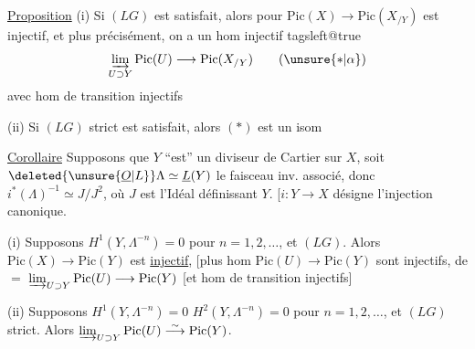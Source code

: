 \uline{Proposition} (i) Si $(LG)$ est satisfait, alors pour  $\mathrm{Pic}(X)\longrightarrow\mathrm{Pic}(X_{/Y})$ est injectif,  et plus précisément, on a un hom injectif
{\csname tagsleft@true\endcsname
\[
\varinjlim_{U\supset Y}\mathrm{Pic}(U)\longrightarrow\mathrm{Pic}(X_{/Y}) \tag*{(\ensuremath{\unsure{*|\alpha}})}
\]
}
avec hom de transition injectifs

(ii) Si $(LG)$ strict est satisfait, alors $(*)$ est un isom

\uline{Corollaire} Supposons que $Y$ ``est'' un diviseur de Cartier sur $X$, soit $\deleted{\unsure{\underline O|L}}\Lambda\simeq\underline L(Y)$ le faisceau inv. associé, donc $i^*(\Lambda)^{-1}\simeq J/J^2$, où $J$ est l'Idéal définissant $Y$. [$i:Y\longrightarrow X$ désigne l'injection canonique.


(i) Supposons $H^1(Y,\Lambda^{-n})=0$ pour $n=1,2,\ldots$, et $(LG)$. Alors $\mathrm{Pic}(X)\longrightarrow\mathrm{Pic}(Y)$ est \uline{injectif}, [plus     hom $\mathrm{Pic}(U)\longrightarrow\mathrm{Pic}(Y)$ sont injectifs,  de $=$ $\varinjlim_{U\supset Y}\mathrm{Pic}(U)\longrightarrow\mathrm{Pic}(Y)$ [et hom de transition injectifs]

(ii) Supposons $H^1(Y,\Lambda^{-n})=0$  $H^2(Y,\Lambda^{-n})=0$ pour $n=1,2,\ldots$, et $(LG)$ strict. Alors $\varinjlim_{U\supset Y}\mathrm{Pic}(U)\overset{\sim}{\longrightarrow}\mathrm{Pic}(Y)$.
